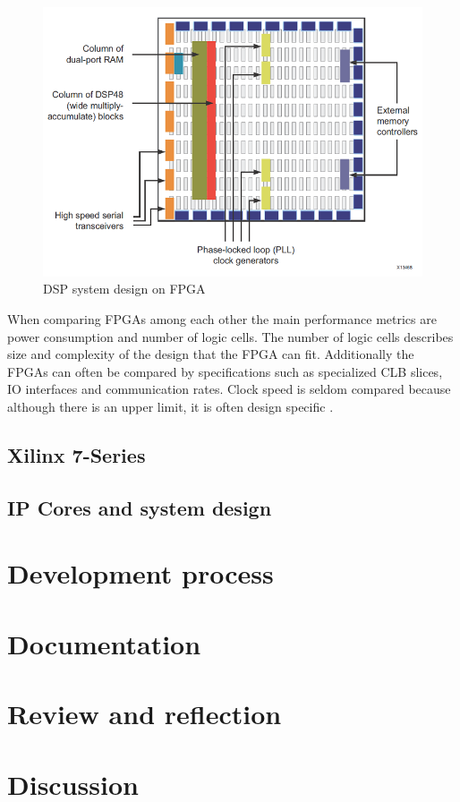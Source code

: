 \documentclass[12pt]{report}
\begin{document}
\begin{figure}[h]
    \centering
    \includegraphics[scale=0.5]{figures/contemporary_fpga.png}
    \caption{DSP system design on FPGA \citep{XilFPGAIntro}}
    \label{fig:5}
\end{figure}

When comparing FPGAs among each other the main performance metrics are power consumption and number of logic cells. The number of logic cells describes size and complexity of the design that the FPGA can fit. Additionally the FPGAs can often be compared by specifications such as specialized CLB slices, IO interfaces and communication rates. Clock speed is seldom compared because although there is an upper limit, it is often design specific \citep{XilClbMan} \citep{XilFPGAIntro}.

\section{Xilinx 7-Series}
  

\section{IP Cores and system design}

\chapter{Development process}

\chapter{Documentation}

\chapter{Review and reflection}

\chapter{Discussion}




\end{document}
